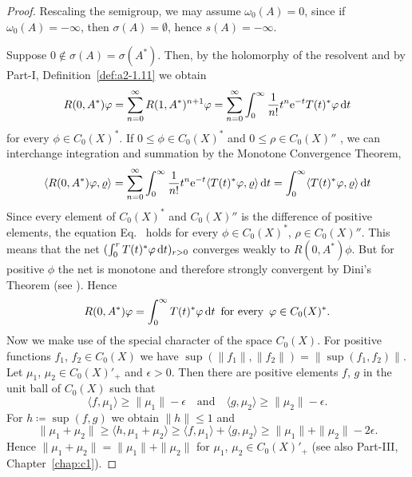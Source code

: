 \begin{proof}
Rescaling the semigroup, we may assume $\omega_{0}(A) = 0$, 
since if $\omega_{0}(A) = -\infty$, then $\sigma(A) = \emptyset$, hence $s(A) = -\infty$.

Suppose $0 \notin \sigma(A) = \sigma(A^*)$. 
Then, by the holomorphy of the resolvent and by Part-I, Definition~\ref{def:a2-1.11} we obtain
\[
   R(0,A^*)\phi = \sum_{n=0}^{\infty} R(1,A^*)^{n+1}\phi = \sum_{n=0}^{\infty} \int_0^{\infty} \frac{1}{n!} t^n \eu^{-t}T(t)^*\phi \dt
\]  
 for every  $\phi \in C_{0}(X)^*$. 
 If\/ $0 \leq \phi \in C_{0}(X)^*$ and $0 \leq \rho \in C_{0}(X)''$ , we can interchange integration and summation by the Monotone Convergence Theorem, \ie
\begin{equation}\label{eq:b4-1.3}
   \langle R(0,A^*)\phi,\rho \rangle = \sum_{n=0}^{\infty} \int_0^{\infty} \frac{1}{n!} t^n \eu^{-t}\langle T(t)^*\phi,\rho \rangle \dt = \int_0^{\infty} \langle T(t)^*\phi,\rho \rangle \dt
\end{equation}
Since every element of\/ $C_{0}(X)^*$ and $C_{0}(X)''$ is the difference of positive
elements, the equation Eq.~ holds for every $\phi \in C_{0}(X)^*$, $\rho \in C_{0}(X)''$. 
This means that the net $(\int_0^r T(t)^*\phi \dt)_{r > 0}$ converges weakly to $R(0,A^*)\phi$. 
But for positive $\phi$ the net is monotone and therefore strongly convergent by Dini's Theorem (see \textcite[II.Theorem~5.9]{schaefer:1974}). 
Hence 
\[
R(0,A^*)\phi = \int_0^{\infty} T(t)^*\phi \dt
\text{ \,for every\, }
\phi \in C_{0}(X)^*
.
\]
Now we make use of the special character of the space $C_{0}(X)$. 
For positive functions $f_1$, $f_2 \in C_{0}(X)$ we have $\sup(\|f_1\|,\|f_2\|) = \|\sup(f_1,f_2)\|$. 
Let $\mu_1$, $\mu_2 \in C_{0}(X)'_+$ and $\epsilon  >  0$. 
Then there are positive elements $f$, $g$ in the unit ball of\/ $C_{0}(X)$ such that 
%
\[
	\langle f,\mu_1 \rangle \geq \|\mu_1\| - \epsilon 
	\quad \text{and} \quad
	\langle g,\mu_2 \rangle \geq \|\mu_2\| - \epsilon.
\]
%
For $h \coloneq \sup(f,g)$ we obtain $\|h\| \leq 1$ and 
%
\[
	 \|\mu_1 + \mu_2\| \geq \langle h,\mu_1 + \mu_2 \rangle \geq \langle f,\mu_1 \rangle + \langle g,\mu_2 \rangle \geq \|\mu_1\| + \|\mu_2\| - 2\epsilon .
\]
%
Hence $\|\mu_1 + \mu_2\| = \|\mu_1\| + \|\mu_2\|$ for $\mu_1$, $\mu_2 \in C_{0}(X)'_+$ (see also Part-III, Chapter~\ref{chap:c1}).


\end{proof}

